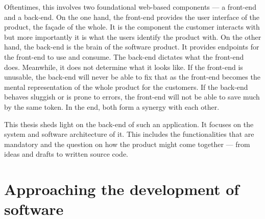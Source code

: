 \documentclass[12pt,a4paper,twoside]{report}
\begin{document}
Oftentimes, this involves two foundational web-based components --- a front-end and a back-end.
On the one hand, the front-end provides the user interface of the product, the façade of the whole.
It is the component the customer interacts with but more importantly it is
what the users identify the product with.
On the other hand, the back-end is the brain of the software product.
It provides endpoints for the front-end to use and consume. The back-end dictates
what the front-end does. Meanwhile, it does not determine what it looks like.
If the front-end is unusable, the back-end will never be able to fix that as the
front-end becomes the mental representation of the whole product for the customers.
If the back-end behaves sluggish or is prone to errors, the front-end will not
be able to save much by the same token. In the end, both form a synergy with each other.

This thesis sheds light on the back-end of such an application.
It focuses on the system and software architecture of it.
This includes the functionalities that are mandatory and the question on
how the product might come together --- from ideas and drafts to written source code.


\section{Approaching the development of software} \label{sect:software-development-process}
\end{document}
